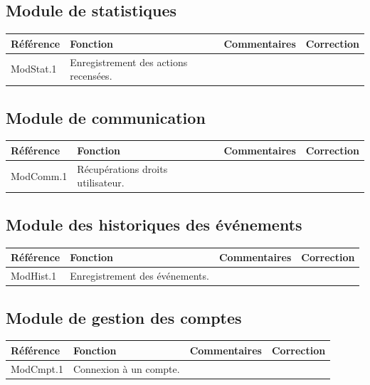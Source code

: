 \documentclass[10pt,a4paper,landscape]{report}
\begin{document}
\subsection{Module de statistiques}

\begin{center}
	\bgroup
	\def\arraystretch{1.5}
	\begin{tabular}{|p{2.5cm}|p{8cm}|p{8cm}|p{8cm}|}
		\hline
		\rowcolor{gris}Référence & Fonction & Commentaires & Correction\\
		\hline
		ModStat.1 & Enregistrement des actions recensées. & & \\
		\hline
	\end{tabular}
	\egroup
\end{center}


\subsection{Module de communication}

\begin{center}
	\bgroup
	\def\arraystretch{1.5}
	\begin{tabular}{|p{2.5cm}|p{8cm}|p{8cm}|p{8cm}|}
		\hline
		\rowcolor{gris}Référence & Fonction & Commentaires & Correction\\
		\hline
		ModComm.1 & Récupérations droits utilisateur. & & \\
		\hline
	\end{tabular}
	\egroup
\end{center}


\subsection{Module des historiques des événements}

\begin{center}
	\bgroup
	\def\arraystretch{1.5}
	\begin{tabular}{|p{2.5cm}|p{8cm}|p{8cm}|p{8cm}|}
		\hline
		\rowcolor{gris}Référence & Fonction & Commentaires & Correction\\
		\hline
		ModHist.1 & Enregistrement des événements. & & \\
		\hline
	\end{tabular}
	\egroup
\end{center}


\subsection{Module de gestion des comptes}

\begin{center}
	\bgroup
	\def\arraystretch{1.5}
	\begin{tabular}{|p{2.5cm}|p{8cm}|p{8cm}|p{8cm}|}
		\hline
		\rowcolor{gris}Référence & Fonction & Commentaires & Correction\\
		\hline
		ModCmpt.1 & Connexion à un compte. & & \\
		\hline
	\end{tabular}
	\egroup
\end{center}
\end{document}
